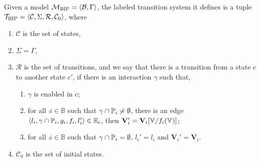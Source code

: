 \begin{definition} 
	\label{operational-semantics}
	Given a \BIP model $\mathcal{M}_{\textsc{BIP}}=\langle{\ensuremath{\mathcal{B}},\Gamma}\rangle$, the labeled transition system it defines is a tuple
	$\mathcal{T}_{\textsc{BIP}} = \langle{\mathcal{C}, \Sigma, \mathcal{R}, \mathcal{C}_{0}}\rangle$, where
	\begin{enumerate}
		\item $\mathcal{C}$ is the set of states,
		\item $\Sigma = \Gamma $,
		\item $\mathcal{R}$ is the set of transitions,
		and we say that there is a transition from a state $c$
		to another state $c'$,
		if there is an interaction $\gamma $ such that,
		\begin{enumerate}
			\item $\gamma$ is enabled in $c$;
			\item for all $\comp{i} \in \mathbb{B}$ such that
			$\gamma \cap \mathbb{P}_{i} \neq \emptyset$, there is an edge
			$\langle{l_i, \gamma \cap \ensuremath{\mathbb{P}_{i}}, g_i, f_i, l_i'}\rangle \in \mathbb{E}_{i} $,
			then $\mathbf{V}'_{i} = \mathbf{V}_{i}[\mathbb{V}_{} / f_i(\mathbb{V}_{})]$;
			\item for all $\comp{i} \in \mathbb{B} $ such that
			$\gamma \cap \mathbb{P}_{i} = \emptyset $,
			$l_i' = l_i$ and $\mathbf{V}_i' = \mathbf{V}_i$.
		\end{enumerate}
		\item $\mathcal{C}_{0}$ is the set of initial states.
	\end{enumerate}
\end{definition}

%
%
%



